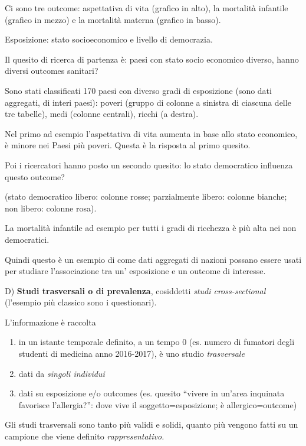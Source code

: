 Ci sono tre outcome: aspettativa di vita (grafico in alto), la mortalità
infantile (grafico in mezzo) e la mortalità materna (grafico in basso).

Esposizione: stato socioeconomico e livello di democrazia.

Il quesito di ricerca di partenza è: paesi con stato socio economico
diverso, hanno diversi outcomes sanitari?

Sono stati classificati 170 paesi con diverso gradi di esposizione (sono
dati aggregati, di interi paesi): poveri (gruppo di colonne a sinistra
di ciascuna delle tre tabelle), medi (colonne centrali), ricchi (a
destra).

Nel primo ad esempio l'aspettativa di vita aumenta in base allo stato
economico, è minore nei Paesi più poveri. Questa è la risposta al primo
quesito.

Poi i ricercatori hanno posto un secondo quesito: lo stato democratico
influenza questo outcome?

(stato democratico libero: colonne rosse; parzialmente libero: colonne
bianche; non libero: colonne rosa).

La mortalità infantile ad esempio per tutti i gradi di ricchezza è più
alta nei non democratici.

Quindi questo è un esempio di come dati aggregati di nazioni possano
essere usati per studiare l'associazione tra un' esposizione e un
outcome di interesse.

D) \textbf{Studi trasversali o di prevalenza}, cosiddetti \emph{studi
cross-sectional} (l'esempio più classico sono i questionari).

L'informazione è raccolta

\begin{enumerate}
\def\labelenumi{\arabic{enumi}.}
\item
  in un istante temporale definito, a un tempo 0 (es. numero di fumatori
  degli studenti di medicina anno 2016-2017), è uno studio
  \emph{trasversale}
\item
  dati da \emph{singoli individui}
\item
  dati su esposizione e/o outcomes (es. quesito ``vivere in un'area
  inquinata favorisce l'allergia?'': dove vive il soggetto=esposizione;
  è allergico=outcome)
\end{enumerate}

Gli studi trasversali sono tanto più validi e solidi, quanto più vengono
fatti su un campione che viene definito \emph{rappresentativo.}

